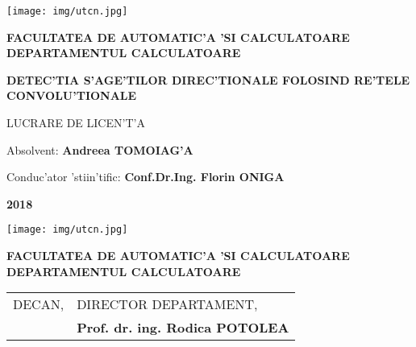 \documentclass[12pt,a4paper,twoside]{report}
\renewcommand{\thesisauthor}{Andreea TOMOIAG'A}    %
\renewcommand{\thesisyear}{2018}      %
\renewcommand{\thesistitle}{DETEC'TIA S'AGE'TILOR DIREC'TIONALE FOLOSIND RE'TELE CONVOLU'TIONALE} %
\renewcommand{\thesissupervisor}{Conf.Dr.Ing. Florin ONIGA}
\newcommand{\department}{FACULTATEA DE AUTOMATIC'A 'SI CALCULATOARE\\
DEPARTAMENTUL CALCULATOARE}
\newcommand{\thesis}{LUCRARE DE LICEN'T'A}
\newcommand{\utcnlogo}{\texttt{[image: img/utcn.jpg]}}
\begin{document}

\newenvironment{definition}[1][Defini'tie.]{\begin{trivlist}
\item[\hskip \labelsep {\bfseries #1}]}{\end{trivlist}}




\setcounter{page}{4}
\setcounter{tocdepth}{4}
\setcounter{secnumdepth}{4}


\begin{center}
\utcnlogo

{\bf \department}

\vspace{4cm}

{\bf \thesistitle} %

\vspace{1.5cm}

\thesis

\vspace{6cm}

Absolvent: {\bf \thesisauthor} 

Conduc'ator 'stiin'tific: {\bf \thesissupervisor}

\vspace{2cm}
{\bf \thesisyear}
\end{center}

\thispagestyle{empty}
\newpage

\begin{center}
\utcnlogo

{\bf \department}
\end{center}
\vspace{0.5cm}

\begin{tabular}{p{7cm}p{8cm}}
 \hspace{-1cm}DECAN, & DIRECTOR DEPARTAMENT,\\
\hspace{-1cm}{\bf Prof. dr. ing. Liviu MICLEA} & {\bf Prof. dr. ing. Rodica POTOLEA}\\  
\end{tabular}
 
\end{document}
